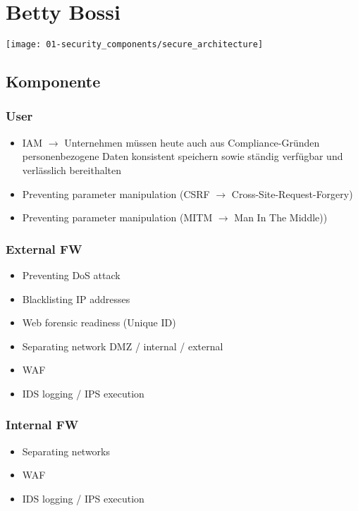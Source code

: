 

\section{Betty Bossi}

\begin{center}
    \vspace{-8pt}
    \texttt{[image: 01-security\_components/secure\_architecture]}
    \vspace{-8pt}
\end{center}

\subsection{Komponente}
\subsubsection{User}
\begin{itemize}
    \item IAM $\rightarrow$ Unternehmen müssen heute auch aus Compliance-Gründen personenbezogene Daten konsistent speichern sowie ständig verfügbar und verlässlich bereithalten
    \item Preventing parameter manipulation (CSRF $\rightarrow$ Cross-Site-Request-Forgery)
    \item Preventing parameter manipulation (MITM $\rightarrow$ Man In The Middle))
\end{itemize}


\subsubsection{External FW}
\begin{itemize}
    \item Preventing DoS attack
    \item Blacklisting IP addresses
    \item Web forensic readiness (Unique ID)
    \item Separating network DMZ / internal / external
    \item WAF
    \item IDS logging / IPS execution
\end{itemize}

\subsubsection{Internal FW}
\begin{itemize}
    \item Separating networks
    \item WAF
    \item IDS logging / IPS execution
\end{itemize}

